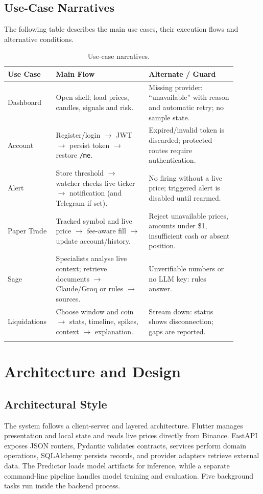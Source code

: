 \subsection{Use-Case Narratives}
The following table describes the main use cases, their execution flows and alternative conditions.
{\renewcommand{\arraystretch}{1.3}
\begin{longtable}{|p{0.15\linewidth}|p{0.38\linewidth}|p{0.36\linewidth}|}
\hline\textbf{Use Case} & \textbf{Main Flow} & \textbf{Alternate / Guard}\\\hline\endhead
Dashboard & Open shell; load prices, candles, signals and risk. & Missing provider: ``unavailable'' with reason and automatic retry; no sample state.\\\hline
Account & Register/login $\rightarrow$ JWT $\rightarrow$ persist token $\rightarrow$ restore \texttt{/me}. & Expired/invalid token is discarded; protected routes require authentication.\\\hline
Alert & Store threshold $\rightarrow$ watcher checks live ticker $\rightarrow$ notification (and Telegram if set). & No firing without a live price; triggered alert is disabled until rearmed.\\\hline
Paper Trade & Tracked symbol and live price $\rightarrow$ fee-aware fill $\rightarrow$ update account/history. & Reject unavailable prices, amounts under \$1, insufficient cash or absent position.\\\hline
Sage & Specialists analyse live context; retrieve documents $\rightarrow$ Claude/Groq or rules $\rightarrow$ sources. & Unverifiable numbers or no LLM key: rules answer.\\\hline
Liquidations & Choose window and coin $\rightarrow$ stats, timeline, spikes, context $\rightarrow$ explanation. & Stream down: status shows disconnection; gaps are reported.\\\hline
\caption{Use-case narratives.}\label{tab:narratives}
\end{longtable}}

\section{Architecture and Design}
\subsection{Architectural Style}
The system follows a client-server and layered architecture. Flutter manages presentation and local state and reads live prices directly from Binance. FastAPI exposes JSON routers, Pydantic validates contracts, services perform domain operations, SQLAlchemy persists records, and provider adapters retrieve external data. The Predictor loads model artifacts for inference, while a separate command-line pipeline handles model training and evaluation. Five background tasks run inside the backend process.

